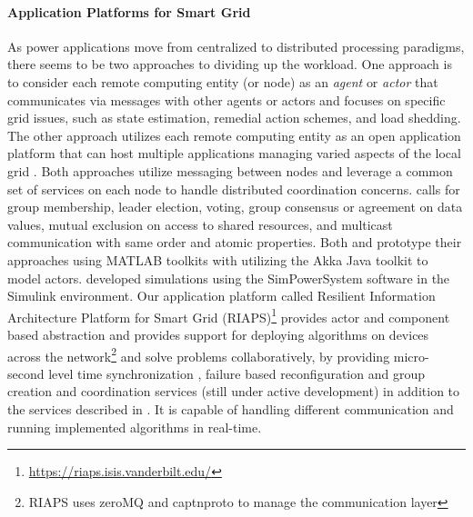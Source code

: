 \documentclass[sigplan]{acmart}
\begin{document}
\paragraph{Application Platforms for Smart Grid} As power applications move from centralized to distributed processing paradigms, there seems to be two approaches to dividing up the workload. One approach is to consider each remote computing entity (or node) as an \textit{agent} \cite{underfreq-2015} or \textit{actor} \cite{agha1985actors} \cite{LeeNiddodiSrivastavaBakken2016} that communicates via messages with other agents or actors and focuses on specific grid issues, such as state estimation, remedial action schemes, and load shedding. The other approach utilizes each remote computing entity as an open application platform that can host multiple applications managing varied aspects of the local grid  \cite{freedmSysArch2014}. Both approaches utilize messaging between nodes and leverage a common set of services on each node to handle distributed coordination concerns. \cite{LeeNiddodiSrivastavaBakken2016} calls for group membership, leader election, voting, group consensus or agreement on data values, mutual exclusion on access to shared resources, and multicast communication with same order and atomic properties. Both \cite{underfreq-2015} and \cite{LeeNiddodiSrivastavaBakken2016} prototype their approaches using MATLAB toolkits with \cite{LeeNiddodiSrivastavaBakken2016} utilizing the Akka Java toolkit to model actors. \cite{Meng2010} developed simulations using the SimPowerSystem software in the Simulink environment. Our application platform called Resilient Information Architecture Platform for Smart Grid (RIAPS)\footnote{\url{https://riaps.isis.vanderbilt.edu/}} \cite{riaps1} provides actor and component based abstraction and provides support for deploying algorithms on devices across the network\footnote{RIAPS uses zeroMQ \cite{hintjens2010zeromq} and captnproto \cite{varda2015cap} to manage the communication layer} and solve problems collaboratively, by providing micro-second level time synchronization \cite{riaps2}, failure based reconfiguration \cite{dubey2017resilience} and group creation and coordination services (still under active development) in addition to the services described in \cite{LeeNiddodiSrivastavaBakken2016} . It is capable of handling different communication and running implemented algorithms in real-time.
\end{document}

